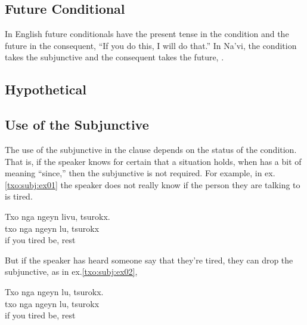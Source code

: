 \subsection{Future Conditional} In English future conditionals have
the present tense in the con\-dition and the future in the consequent,
``If you do this, I will do that.''  In Na'vi, the condition takes the
subjunctive and the consequent takes the future,  . 

\subsection{Hypothetical} 

\subsection{Use of the Subjunctive} 
The use of the subjunctive in the  clause depends on the status
of the condition.  That is, if the speaker knows for certain that a
situation holds, when  has a bit of meaning ``since,'' then the
subjunctive is not required.  For example, in ex.\ref{txo:subj:ex01}
the speaker does not really know if the person they are talking to is
tired. 

\begin{interlin} \label{txo:subj:ex01}
\glll Txo nga ngeyn livu, tsurokx. \\
      txo nga ngeyn lu, tsurokx \\ 
      if you tired be, rest \\
\end{interlin}

\noindent But if the speaker has heard someone say that they're tired,
they can drop the subjunctive, as in ex.\ref{txo:subj:ex02},

\begin{interlin} \label{txo:subj:ex02}
\glll Txo nga ngeyn lu, tsurokx. \\
      txo nga ngeyn lu, tsurokx \\
      if you tired be, rest \\
\end{interlin}

